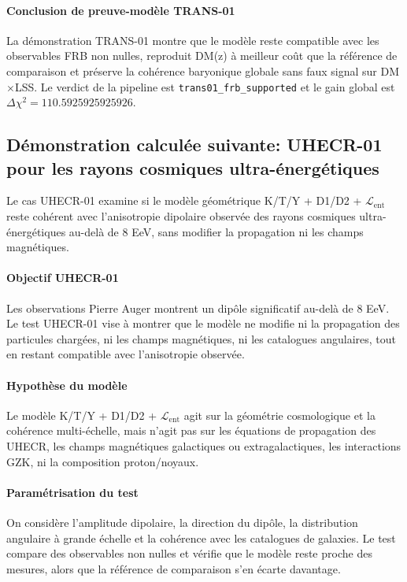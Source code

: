 \documentclass[11pt,a4paper]{article}
\newcommand{\Lent}{\mathcal{L}_{\mathrm{ent}}}
\begin{document}
\FloatBarrier

\paragraph{Conclusion de preuve-modèle TRANS-01}
La démonstration TRANS-01 montre que le modèle reste compatible avec les observables FRB non nulles, reproduit DM(z) à meilleur coût que la référence de comparaison et préserve la cohérence baryonique globale sans faux signal sur DM$\times$LSS. Le verdict de la pipeline est \texttt{trans01\_frb\_supported} et le gain global est $\Delta\chi^2=110.5925925925926$.

\subsection{Démonstration calculée suivante: UHECR-01 pour les rayons cosmiques ultra-énergétiques}
Le cas UHECR-01 examine si le modèle géométrique K/T/Y + D1/D2 + $\Lent$ reste cohérent avec l'anisotropie dipolaire observée des rayons cosmiques ultra-énergétiques au-delà de 8 EeV, sans modifier la propagation ni les champs magnétiques.

\paragraph{Objectif UHECR-01}
Les observations Pierre Auger montrent un dipôle significatif au-delà de 8 EeV. Le test UHECR-01 vise à montrer que le modèle ne modifie ni la propagation des particules chargées, ni les champs magnétiques, ni les catalogues angulaires, tout en restant compatible avec l'anisotropie observée.

\paragraph{Hypothèse du modèle}
Le modèle K/T/Y + D1/D2 + $\Lent$ agit sur la géométrie cosmologique et la cohérence multi-échelle, mais n'agit pas sur les équations de propagation des UHECR, les champs magnétiques galactiques ou extragalactiques, les interactions GZK, ni la composition proton/noyaux.

\paragraph{Paramétrisation du test}
On considère l'amplitude dipolaire, la direction du dipôle, la distribution angulaire à grande échelle et la cohérence avec les catalogues de galaxies. Le test compare des observables non nulles et vérifie que le modèle reste proche des mesures, alors que la référence de comparaison s'en écarte davantage.
\end{document}
